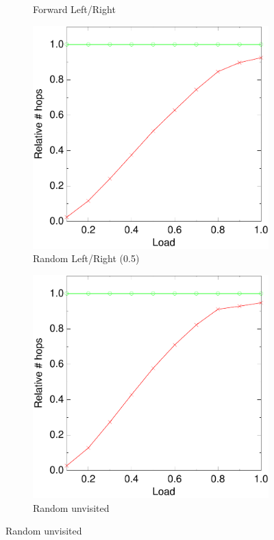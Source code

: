 \documentclass[10pt,a4paper]{article}
\begin{document}
\begin{figure}
\begin{subfigure}[b]{0.5\textwidth}
                \caption{Forward Left/Right}
        \end{subfigure}
        
        \begin{subfigure}[b]{0.5\textwidth}
                \centering
                \includegraphics[width=\textwidth]{data/4randswitchrandswitch.pdf}
                \caption{Random Left/Right (0.5)}
        \end{subfigure}
        \begin{subfigure}[b]{0.5\textwidth}
                \centering
                \includegraphics[width=\textwidth]{data/4randunvisitedrandunvisited.pdf}
                \caption{Random unvisited}
        \end{subfigure}
        

\end{figure}
\end{document}
